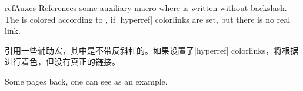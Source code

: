 \begin{docCommand}[doc updated=2020-02-11]{refAuxcs}{}
References some auxiliary macro  where  is
written without backslash.
The  is colored according to ,
if |hyperref| colorlinks are set, but there is no real link.

引用一些辅助宏，其中是不带反斜杠的。如果设置了|hyperref| colorlinks，将根据进行着色，但没有真正的链接。
\begin{dispExample}
Some pages back, one can see  as an example.
\end{dispExample}
\end{docCommand}
